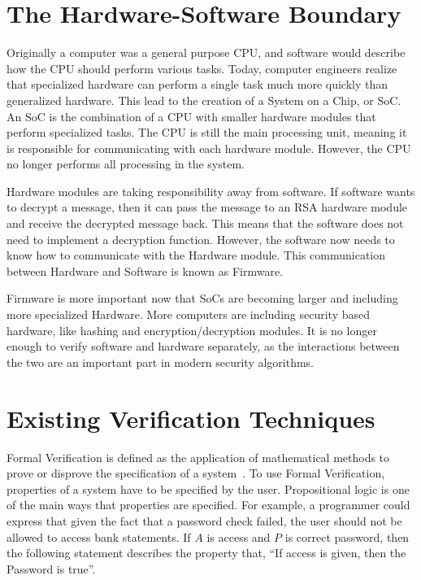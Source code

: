 \section{The Hardware-Software Boundary}

Originally a computer was a general purpose CPU, and software would
describe how the CPU should perform various tasks.
Today, computer engineers realize that specialized hardware can perform a single
task much more quickly than generalized hardware.
This lead to the creation of a System on a Chip, or SoC. An SoC is the
combination of a CPU with smaller hardware modules that perform specialized
tasks.
The CPU is still the main processing unit, meaning it is responsible for
communicating with each hardware module.
However, the CPU no longer performs all processing in the system.

Hardware modules are taking responsibility away from software.
If software wants to decrypt a message, then it can pass the message to an RSA
hardware module and receive the decrypted message back.
This means that the software does not need to implement a decryption function.
However, the software now needs to know how to communicate with the Hardware
module. This communication between Hardware and Software is known as Firmware.

Firmware is more important now that SoCs are becoming larger and including more
specialized Hardware. 
More computers are including security based hardware, like hashing and encryption/decryption modules.
It is no longer enough to verify software and hardware separately, as the
interactions between the two are an important part in modern security
algorithms.

\section{Existing Verification Techniques}

Formal Verification is defined as the application of mathematical methods to
prove or disprove the specification of a system~\cite{greenstreet}.
To use Formal Verification, properties of a system have to be specified by the
user. 
Propositional logic is one of the main ways that properties are specified.
For example, a programmer could express that given the fact that a password
check failed, the user should not be allowed to access bank statements.
If $A$ is access and $P$ is correct password, then the following statement
describes the property that, ``If access is given, then the Password is true''.

